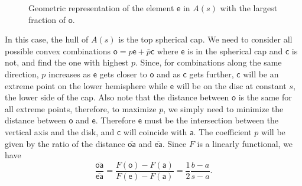\documentclass[10pt,twocolumn, nofootinbib]{revtex4-2}
\newcommand{\ens}[1][e] {\mathsf{#1}} %
\begin{document}
\begin{figure}[H]
	\caption{Geometric representation of the element $\ens[e]$ in $A(s)$ with the largest fraction of $\ens[o]$.}
\end{figure}

In this case, the hull of $A(s)$ is the top spherical cap. We need to consider all possible convex combinations $\ens[o] = p \ens + \bar{p} \ens[c]$ where $\ens$ is in the spherical cap and $\ens[c]$ is not, and find the one with highest $p$. Since, for combinations along the same direction, $p$ increases as $\ens$ gets closer to $\ens[o]$ and as $\ens[c]$ gets further, $\ens[c]$ will be an extreme point on the lower hemisphere while $\ens$ will be on the disc at constant $s$, the lower side of the cap. Also note that the distance between $\ens[o]$ is the same for all extreme points, therefore, to maximize $p$, we simply need to minimize the distance between $\ens[o]$ and $\ens$. Therefore $\ens$ must be the intersection between the vertical axis and the disk, and $\ens[c]$ will coincide with $\ens[a]$. The coefficient $p$ will be given by the ratio of the distance $\overline{\ens[o]\ens[a]}$ and $\overline{\ens\ens[a]}$. Since $F$ is a linearly functional, we have
\begin{equation}
	\frac{\overline{\ens[o]\ens[a]}}{\overline{\ens\ens[a]}} = \frac{F(\ens[o])-F(\ens[a])}{F(\ens) - F(\ens[a])} = \frac{1}{2} \frac{b - a}{s-a}.
\end{equation}
\end{document}
